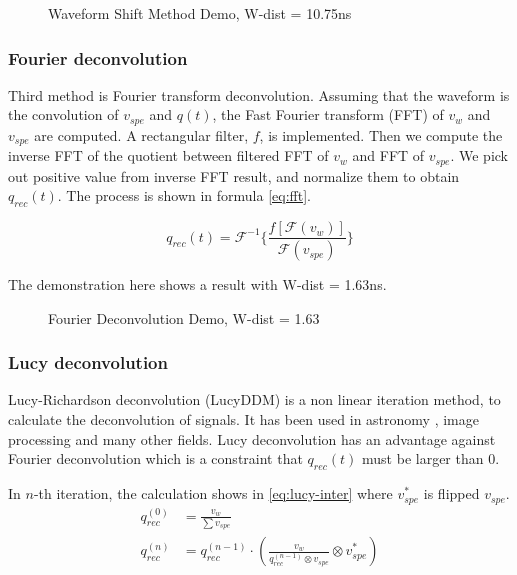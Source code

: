 \begin{figure}[H]
    \centering
    \scalebox{0.4}{}
    \caption{Waveform Shift Method Demo, W-dist = 10.75ns}
\end{figure}

\subsubsection{Fourier deconvolution}

Third method is Fourier transform deconvolution. Assuming that the waveform is the convolution of $v_{spe}$ and $q(t)$, the Fast Fourier transform (FFT) of $v_{w}$ and $v_{spe}$ are computed. A rectangular filter, $f$, is implemented. Then we compute the inverse FFT of the quotient between filtered FFT of $v_{w}$ and FFT of $v_{spe}$. We pick out positive value from inverse FFT result, and normalize them to obtain $q_{rec}(t)$. The process is shown in formula \eqref{eq:fft}. 

\begin{equation}
    q_{rec}(t) = \mathcal{F}^{-1}\{\frac{f[\mathcal{F}(v_{w})]}{\mathcal{F}(v_{spe})}\}
    \label{eq:fft}
\end{equation}

The demonstration here shows a result with W-dist = 1.63ns. 

\begin{figure}[H]
    \centering
    \scalebox{0.4}{}
    \caption{Fourier Deconvolution Demo, W-dist = 1.63}
\end{figure}

\subsubsection{Lucy deconvolution}

Lucy-Richardson deconvolution (LucyDDM) is a non linear iteration method, to calculate the deconvolution of signals. It has been used in astronomy \cite{li_richardson-lucy_2019}, image processing and many other fields. Lucy deconvolution has an advantage against Fourier deconvolution which is a constraint that $q_{rec}(t)$ must be larger than 0. 

In $n$-th iteration, the calculation shows in \eqref{eq:lucy-inter} where $v^{*}_{spe}$ is flipped $v_{spe}$. 
\begin{align}
    q_{rec}^{(0)} &= \frac{v_{w}}{\sum v_{spe}} \\
    q_{rec}^{(n)} &= q_{rec}^{(n-1)} \cdot \left(\frac{v_{w}}{q_{rec}^{(n-1)} \otimes v_{spe}} \otimes v^{*}_{spe}\right) \label{eq:lucy-inter}
\end{align}

